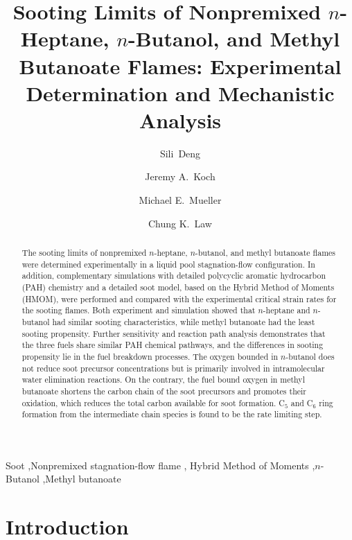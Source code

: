 \documentclass[review,3p,times]{elsarticleUS}
\begin{document}
\begin{frontmatter}

\title{Sooting Limits of Nonpremixed $n$-Heptane, $n$-Butanol, and Methyl Butanoate Flames: Experimental Determination and Mechanistic Analysis}

\author{Sili~Deng}
\author{Jeremy A.~Koch}
\author{Michael E.~Mueller}
\author{Chung K.~Law}

\address{Department of Mechanical and Aerospace Engineering, Princeton University, Princeton, NJ 08544, USA}


\begin{abstract}
The sooting limits of nonpremixed $n$-heptane, $n$-butanol, and methyl butanoate flames were determined experimentally in a liquid pool stagnation-flow configuration. In addition, complementary simulations with detailed polycyclic aromatic hydrocarbon (PAH) chemistry and a detailed soot model, based on the Hybrid Method of Moments (HMOM), were performed and compared with the experimental critical strain rates for the sooting flames. Both experiment and simulation showed that $n$-heptane and $n$-butanol had similar sooting characteristics, while methyl butanoate had the least sooting propensity. Further sensitivity and reaction path analysis demonstrates that the three fuels share similar PAH chemical pathways, and the differences in sooting propensity lie in the fuel breakdown processes. The oxygen bounded in $n$-butanol does not reduce soot precursor concentrations but is primarily involved in intramolecular water elimination reactions. On the contrary, the fuel bound 
oxygen in methyl butanoate shortens the carbon chain of the soot precursors and promotes their oxidation, which reduces the total carbon available for soot formation. C$_5$ and C$_6$ ring formation from the intermediate chain species is found to be the rate limiting step. 
\end{abstract}

\begin{keyword} 
Soot \sep Nonpremixed stagnation-flow flame \sep
Hybrid Method of Moments \sep $n$-Butanol \sep Methyl butanoate
\end{keyword}

\end{frontmatter}

\section{Introduction}
\end{document}
